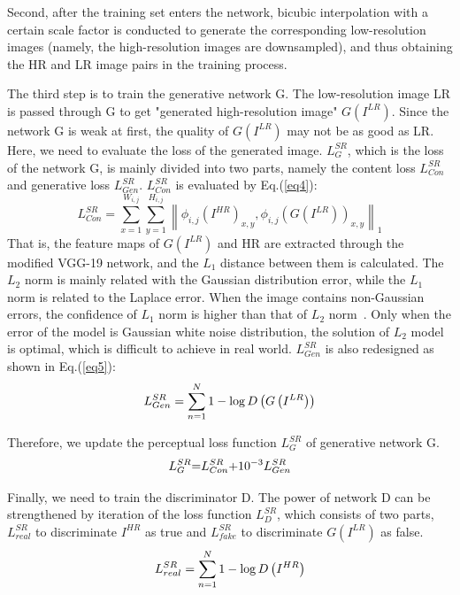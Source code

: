 \documentclass[10pt,twocolumn,letterpaper]{article}
\begin{document}
Second, after the training set enters the network, bicubic interpolation with a certain scale factor is conducted to generate the corresponding low-resolution images (namely, the high-resolution images are downsampled), and thus obtaining the HR and LR image pairs in the training process.

The third step is to train the generative network G. The low-resolution image LR is passed through G to get "generated high-resolution image" $G{\left(I^{L R}\right)}$. Since the network G is weak at first, the quality of $G{\left(I^{L R}\right)}$ may not be as good as LR. Here, we need to evaluate the loss of the generated image. $L_{G}^{SR}$, which is the loss of the network G,  is mainly divided into two parts, namely the content loss $L_{Con}^{SR} $ and generative loss $L_{Gen} ^{SR}$. $L_{Con}^{SR}$ is evaluated by Eq.(\ref{eq4}):
\begin{equation}\label{eq4}
L_{Con}^{SR} = \sum\limits_{x = 1}^{{W_{i,j}}} {\sum\limits_{y = 1}^{{H_{i,j}}} {{{\left\| {{\phi _{i,j}}{{\left( {{I^{HR}}} \right)}_{x,y}},{\phi _{i,j}}{{\left( {G\left( {{I^{LR}}} \right)} \right)}_{x,y}}} \right\|}_1}} } 
\end{equation} 
That is, the feature maps of $G{\left(I^{LR}\right)}$ and HR are extracted through the modified VGG-19 network, and the $L_1$ distance between them is calculated. The $L_2$ norm is mainly related with the Gaussian distribution error, while the $L_1$ norm is related to the Laplace error. When the image contains non-Gaussian errors, the confidence of $L_1$ norm is higher than that of $L_2$ norm~\cite{song2010adaptive}. Only when the error of the model is Gaussian white noise distribution, the solution of $L_2$ model is optimal, which is difficult to achieve in real world. 
$L_{Gen}^{SR}$ is also redesigned as shown in Eq.(\ref{eq5}):
\begin{equation}\label{eq5}
L_{Gen}^{SR} = \sum\limits_{n = 1}^N {{\rm{1}} - \log D\left( {G\left( {{I^{LR}}} \right)} \right)} 
\end{equation}

Therefore, we update the perceptual loss function $L_{G}^{SR}$ of generative network G.
\begin{equation}\label{eq6}
L_G^{SR}{\rm{ = }}L_{Con}^{SR}{\rm{ + 1}}{{\rm{0}}^{{\rm{ - 3}}}}L_{Gen}^{SR}
\end{equation}

Finally, we need to train the discriminator D. The power of network D can be strengthened by iteration of the loss function $L_{D}^{SR}$, which consists of two parts,  $L_{real}^{SR}$ to discriminate $I^{HR}$ as true and $L_{fake}^{SR}$ to discriminate $G{\left(I^{L R}\right)}$ as false.
\begin{equation}\label{eq7}
L_{real}^{SR} = \sum\limits_{n = 1}^N {{\rm{1}} - \log D\left( {{I^{HR}}} \right)}
\end{equation}
\end{document}

